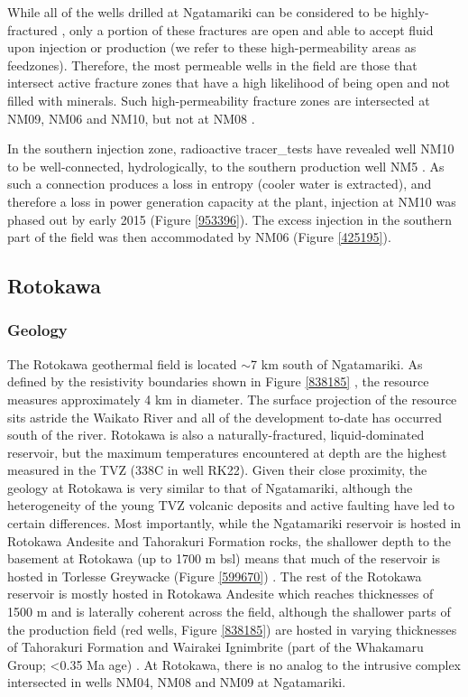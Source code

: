 While all of the wells drilled at Ngatamariki can be considered to be highly-fractured \citep{nm09_report,nm10_report,massiot_2012}, only a portion of these fractures are open and able to accept fluid upon injection or production (we refer to these high-\gls{permeability} areas as \glspl{feedzone}). Therefore, the most permeable wells in the field are those that intersect active fracture zones that have a high likelihood of being open and not filled with minerals. Such high-\gls{permeability} fracture zones are intersected at NM09, NM06 and NM10, but not at NM08 \citep{nm09_report,nm10_report,massiot_2012}.

In the southern injection zone, radioactive \glspl{tracer_test} have revealed well NM10 to be well-connected, hydrologically, to the southern production well NM5 \citep{buscarlet_2015}. As such a connection produces a loss in entropy (cooler water is extracted), and therefore a loss in power generation capacity at the plant, injection at NM10 was phased out by early 2015 (Figure \ref{953396}). The excess injection in the southern part of the field was then accommodated by NM06 (Figure \ref{425195}).

\subsection{Rotokawa}
\subsubsection{Geology}
The Rotokawa geothermal field is located $\sim$7 km south of Ngatamariki. As defined by the resistivity boundaries shown in Figure \ref{838185} \citep{Risk_2000}, the resource measures approximately 4 km in diameter. The surface projection of the resource sits astride the Waikato River and all of the development to-date has occurred south of the river. Rotokawa is also a naturally-fractured, liquid-dominated reservoir, but the maximum temperatures encountered at depth are the highest measured in the \acrshort{TVZ} (338\textdegree C in well RK22). Given their close proximity, the geology at Rotokawa is very similar to that of Ngatamariki, although the heterogeneity of the young \acrshort{TVZ} volcanic deposits and active faulting have led to certain differences. Most importantly, while the Ngatamariki reservoir is hosted in Rotokawa Andesite and Tahorakuri Formation rocks, the shallower depth to the basement at Rotokawa (up to 1700 m bsl) means that much of the reservoir is hosted in Torlesse Greywacke (Figure \ref{599670}) \citep{wallis2013,McNamara_2016}. The rest of the Rotokawa reservoir is mostly hosted in Rotokawa Andesite which reaches thicknesses of 1500 m and is laterally coherent across the field, although the shallower parts of the production field (red wells, Figure \ref{838185}) are hosted in varying thicknesses of Tahorakuri Formation and Wairakei Ignimbrite (part of the Whakamaru Group; \textless0.35 Ma age) \citep{McNamara_2016}. At Rotokawa, there is no analog to the intrusive complex intersected in wells NM04, NM08 and NM09 at Ngatamariki.

